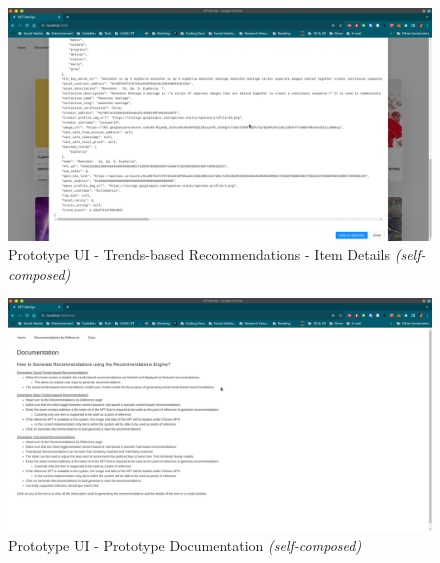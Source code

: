 \begin{figure}[h!]
\centering
\includegraphics[width=\textwidth]{images/appendix/Prototype/UI/Prototype UI 6.png}
\caption{Prototype UI - Trends-based Recommendations - Item Details \textit{(self-composed)}}
\end{figure}

\begin{figure}[h!]
\centering
\includegraphics[width=\textwidth]{images/appendix/Prototype/UI/Prototype UI 4.png}
\caption{Prototype UI - Prototype Documentation \textit{(self-composed)}}
\end{figure}

